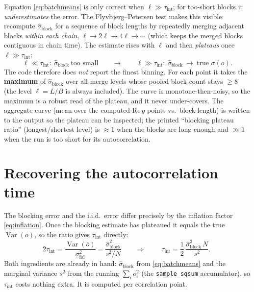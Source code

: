 \documentclass[11pt]{article}
\newcommand{\code}[1]{\texttt{#1}}
\newcommand{\Var}{\operatorname{Var}}
\newcommand{\tauint}{\tau_{\mathrm{int}}}
\begin{document}
Equation \eqref{eq:batchmeans} is only correct when $\ell \gg \tauint$; for too-short
blocks it \emph{underestimates} the error. The Flyvbjerg--Petersen test makes this
visible: recompute $\hat\sigma_{\mathrm{block}}$ for a sequence of block lengths by
repeatedly merging adjacent blocks \emph{within each chain},
$\ell \to 2\ell \to 4\ell \to \cdots$ (which keeps the merged blocks contiguous in
chain time). The estimate rises with $\ell$ and then \emph{plateaus} once
$\ell \gg \tauint$:
\[
  \ell \ll \tauint:\ \hat\sigma_{\mathrm{block}}\ \text{too small}
  \qquad\longrightarrow\qquad
  \ell \gg \tauint:\ \hat\sigma_{\mathrm{block}}\ \to\ \text{true } \sigma(\bar o).
\]
The code therefore does \emph{not} report the finest binning. For each point it
takes the \textbf{maximum} of $\hat\sigma_{\mathrm{block}}$ over all merge levels
whose pooled block count stays $\ge 8$ (the level $\ell=L/B$ is always included).
The curve is monotone-then-noisy, so the maximum is a robust read of the plateau,
and it never under-covers. The aggregate curve (mean over the computed
$\mathrm{Re}\,g$ points vs.\ block length) is written to the output so the plateau
can be inspected; the printed ``blocking plateau ratio'' (longest/shortest level)
is $\approx 1$ when the blocks are long enough and $\gg 1$ when the run is too
short for its autocorrelation.

\section{Recovering the autocorrelation time}

The blocking error and the i.i.d.\ error differ precisely by the inflation factor
\eqref{eq:inflation}. Once the blocking estimate has plateaued it equals the true
$\Var(\bar o)$, so the ratio gives $\tauint$ directly:
\begin{equation}
  2\tauint
  = \frac{\Var(\bar o)}{\sigma_{\mathrm{iid}}^2}
  = \frac{\hat\sigma_{\mathrm{block}}^2}{s^2/N}
  \qquad\Longrightarrow\qquad
  \boxed{\;
  \tauint = \frac12\,\frac{\hat\sigma_{\mathrm{block}}^2\,N}{s^2} .
  \;}
  \label{eq:tau-recover}
\end{equation}
Both ingredients are already in hand: $\hat\sigma_{\mathrm{block}}$ from
\eqref{eq:batchmeans} and the marginal variance $s^2$ from the running
$\sum_i o_i^2$ (the \code{sample\_sqsum} accumulator), so $\tauint$ costs nothing
extra. It is computed per correlation point.
\end{document}
